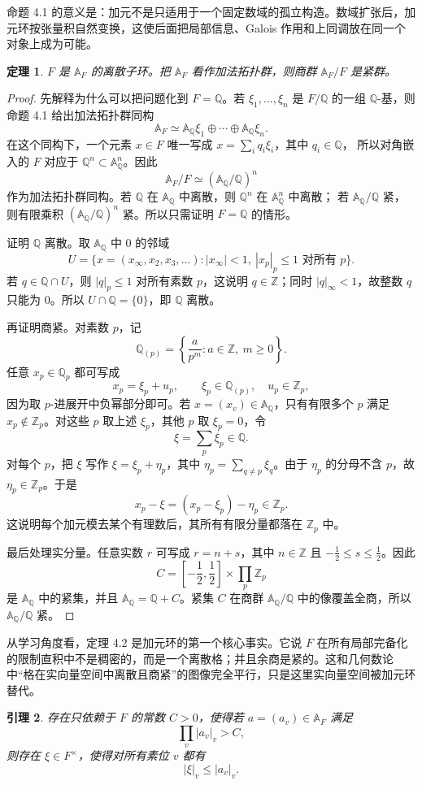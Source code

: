 \documentclass[11pt,a4paper,openany]{ctexbook}
\numberwithin{equation}{chapter}
\newcommand{\Q}{\mathbb{Q}}
\newcommand{\Z}{\mathbb{Z}}
\newcommand{\A}{\mathbb{A}}
\theoremstyle{plain}
\newtheorem{theorem}{定理}[chapter]
\newtheorem{lemma}[theorem]{引理}
\theoremstyle{definition}
\theoremstyle{remark}
\begin{document}
命题 4.1 的意义是：加元不是只适用于一个固定数域的孤立构造。数域扩张后，加元环按张量积自然变换，这使后面把局部信息、Galois 作用和上同调放在同一个对象上成为可能。

\begin{theorem}
$F$ 是 $\A_F$ 的离散子环。把 $\A_F$ 看作加法拓扑群，则商群 $\A_F/F$ 是紧群。
\end{theorem}

\begin{proof}
先解释为什么可以把问题化到 $F=\Q$。若 $\xi_1,\ldots,\xi_n$ 是 $F/\Q$ 的一组 $\Q$-基，则命题 4.1 给出加法拓扑群同构
\[
 \A_F\simeq \A_\Q\xi_1\oplus\cdots\oplus \A_\Q\xi_n.
\]
在这个同构下，一个元素 $x\in F$ 唯一写成 $x=\sum_iq_i\xi_i$，其中 $q_i\in\Q$，
所以对角嵌入的 $F$ 对应于 $\Q^n\subset\A_\Q^n$。因此
\[
\A_F/F\simeq(\A_\Q/\Q)^n
\]
作为加法拓扑群同构。若 $\Q$ 在 $\A_\Q$ 中离散，则 $\Q^n$ 在 $\A_\Q^n$ 中离散；
若 $\A_\Q/\Q$ 紧，则有限乘积 $(\A_\Q/\Q)^n$ 紧。所以只需证明 $F=\Q$ 的情形。

证明 $\Q$ 离散。取 $\A_\Q$ 中 $0$ 的邻域
\[
 U=\{x=(x_\infty,x_2,x_3,\ldots): |x_\infty|<1,\ |x_p|_p\le1\text{ 对所有 }p\}.
\]
若 $q\in\Q\cap U$，则 $|q|_p\le1$ 对所有素数 $p$，这说明 $q\in\Z$；同时 $|q|_\infty<1$，故整数 $q$ 只能为 $0$。所以 $U\cap\Q=\{0\}$，即 $\Q$ 离散。

再证明商紧。对素数 $p$，记
\[
 \Q_{(p)}=\left\{\frac{a}{p^m}:a\in\Z,\ m\ge0\right\}.
\]
任意 $x_p\in\Q_p$ 都可写成
\[
 x_p=\xi_p+u_p,\qquad \xi_p\in\Q_{(p)},\quad u_p\in\Z_p,
\]
因为取 $p$-进展开中负幂部分即可。若 $x=(x_v)\in\A_\Q$，只有有限多个 $p$ 满足 $x_p\notin\Z_p$。对这些 $p$ 取上述 $\xi_p$，其他 $p$ 取 $\xi_p=0$，令
\[
 \xi=\sum_p\xi_p\in\Q.
\]
对每个 $p$，把 $\xi$ 写作 $\xi=\xi_p+\eta_p$，其中 $\eta_p=\sum_{q\ne p}\xi_q$。由于 $\eta_p$ 的分母不含 $p$，故 $\eta_p\in\Z_p$。于是
\[
 x_p-\xi=(x_p-\xi_p)-\eta_p\in\Z_p.
\]
这说明每个加元模去某个有理数后，其所有有限分量都落在 $\Z_p$ 中。

最后处理实分量。任意实数 $r$ 可写成 $r=n+s$，其中 $n\in\Z$ 且 $-\frac12\le s\le\frac12$。因此
\[
 C=\left[-\frac12,\frac12\right]\times\prod_p\Z_p
\]
是 $\A_\Q$ 中的紧集，并且 $\A_\Q=\Q+C$。紧集 $C$ 在商群 $\A_\Q/\Q$ 中的像覆盖全商，所以 $\A_\Q/\Q$ 紧。
\end{proof}

从学习角度看，定理 4.2 是加元环的第一个核心事实。它说 $F$ 在所有局部完备化的限制直积中不是稠密的，而是一个离散格；并且余商是紧的。这和几何数论中“格在实向量空间中离散且商紧”的图像完全平行，只是这里实向量空间被加元环替代。

\begin{lemma}
存在只依赖于 $F$ 的常数 $C>0$，使得若 $a=(a_v)\in\A_F$ 满足
\[
 \prod_v |a_v|_v>C,
\]
则存在 $\xi\in F^\times$，使得对所有素位 $v$ 都有
\[
 |\xi|_v\le |a_v|_v.
\]
\end{lemma}
\end{document}
